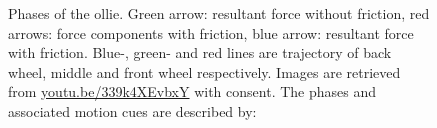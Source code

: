 \documentclass[default,iicol]{sn-jnl}
\begin{document}
\begin{figure}[!t]
  \protect\newline
  \centering
  \captionsetup{singlelinecheck=off}
   \caption[Ollie motion cues]{Phases of the ollie.
    Green arrow: resultant force without friction, red arrows: force components
    with friction, blue arrow: resultant force with friction. Blue-, green- and
     red lines are trajectory of back wheel, middle and front wheel respectively. Images are retrieved from \url{youtu.be/339k4XEvbxY} with consent. The phases and associated motion cues are described by:
}
\end{figure}
\end{document}
